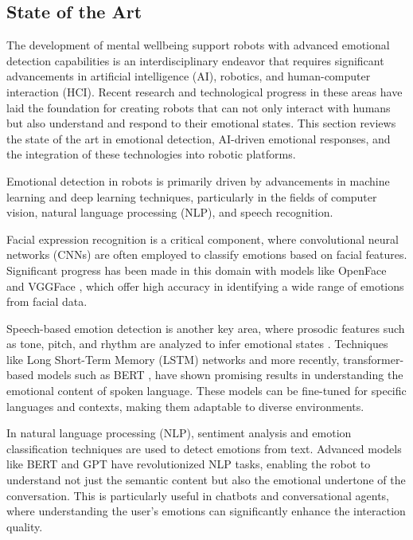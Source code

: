 \subsection{State of the Art}
    
The development of mental wellbeing support robots with advanced emotional detection capabilities is an interdisciplinary endeavor that requires significant advancements in artificial intelligence (AI), robotics, and human-computer interaction (HCI). Recent research and technological progress in these areas have laid the foundation for creating robots that can not only interact with humans but also understand and respond to their emotional states. This section reviews the state of the art in emotional detection, AI-driven emotional responses, and the integration of these technologies into robotic platforms.

Emotional detection in robots is primarily driven by advancements in machine learning and deep learning techniques, particularly in the fields of computer vision, natural language processing (NLP), and speech recognition.

Facial expression recognition is a critical component, where convolutional neural networks (CNNs) are often employed to classify emotions based on facial features. Significant progress has been made in this domain with models like OpenFace \cite{baltrusaitis2018} and VGGFace \cite{zhang2023}, which offer high accuracy in identifying a wide range of emotions from facial data.

Speech-based emotion detection is another key area, where prosodic features such as tone, pitch, and rhythm are analyzed to infer emotional states \cite{swethashree2021}. Techniques like Long Short-Term Memory (LSTM) networks and more recently, transformer-based models such as BERT \cite{devlin2019}, have shown promising results in understanding the emotional content of spoken language. These models can be fine-tuned for specific languages and contexts, making them adaptable to diverse environments.

In natural language processing (NLP), sentiment analysis and emotion classification techniques are used to detect emotions from text. Advanced models like BERT \cite{wu2024} and GPT \cite{shahriar2024} have revolutionized NLP tasks, enabling the robot to understand not just the semantic content but also the emotional undertone of the conversation. This is particularly useful in chatbots and conversational agents, where understanding the user's emotions can significantly enhance the interaction quality.

